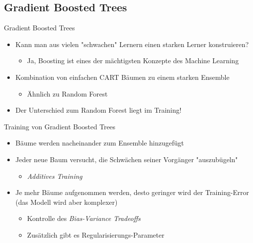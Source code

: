 \subsection{Gradient Boosted Trees}

\begin{frame}{Gradient Boosted Trees}
    \begin{itemize}
        \item Kann man aus vielen "schwachen" Lernern einen starken Lerner konstruieren?
            \begin{itemize}
                \item[\Rightarrow] Ja, Boosting ist eines der m\"achtigsten Konzepte des Machine Learning \cite{elements}
            \end{itemize}
        \item Kombination von einfachen CART B\"aumen zu einem starken Ensemble
            \begin{itemize}
                \item[\Rightarrow] \"Ahnlich zu Random Forest
            \end{itemize}
        \item Der Unterschied zum Random Forest liegt im Training!
    \end{itemize}
\end{frame}

\begin{frame}{Training von Gradient Boosted Trees}
    \begin{itemize}
        \item B\"aume werden nacheinander zum Ensemble hinzugef\"ugt
        \item Jeder neue Baum versucht, die Schw\"achen seiner Vorg\"anger "auszub\"ugeln"
            \begin{itemize}
                \item[\Rightarrow] \textit{Additives Training}
            \end{itemize}
        \item Je mehr B\"aume aufgenommen werden, desto geringer wird der Training-Error (das Modell wird aber komplexer)
            \begin{itemize}
                \item[\Rightarrow] Kontrolle des \textit{Bias-Variance Tradeoffs}
                \item[\Rightarrow] Zus\"atzlich gibt es Regularisierungs-Parameter
            \end{itemize}
    \end{itemize}
\end{frame}

